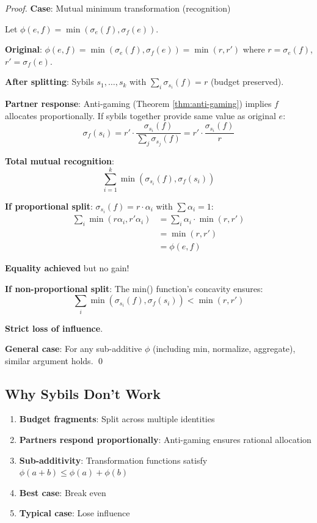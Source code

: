 \documentclass[11pt,a4paper]{article}
\theoremstyle{definition}
\theoremstyle{remark}
\begin{document}
\begin{proof}
\textbf{Case}: Mutual minimum transformation (recognition)

Let $\phi(e,f) = \min(\sigma_e(f), \sigma_f(e))$.

\textbf{Original}: $\phi(e,f) = \min(\sigma_e(f), \sigma_f(e)) = \min(r, r')$ where $r = \sigma_e(f)$, $r' = \sigma_f(e)$.

\textbf{After splitting}: Sybils $s_1, \ldots, s_k$ with $\sum_i \sigma_{s_i}(f) = r$ (budget preserved).

\textbf{Partner response}: Anti-gaming (Theorem \ref{thm:anti-gaming}) implies $f$ allocates proportionally. If sybils together provide same value as original $e$:
\[ \sigma_f(s_i) = r' \cdot \frac{\sigma_{s_i}(f)}{\sum_j \sigma_{s_j}(f)} = r' \cdot \frac{\sigma_{s_i}(f)}{r} \]

\textbf{Total mutual recognition}:
\[ \sum_{i=1}^k \min(\sigma_{s_i}(f), \sigma_f(s_i)) \]

\textbf{If proportional split}: $\sigma_{s_i}(f) = r \cdot \alpha_i$ with $\sum \alpha_i = 1$:
\begin{align*}
\sum_i \min(r\alpha_i, r'\alpha_i) &= \sum_i \alpha_i \cdot \min(r, r') \\
&= \min(r, r') \\
&= \phi(e,f)
\end{align*}

\textbf{Equality achieved} but no gain!

\textbf{If non-proportional split}: The min() function's concavity ensures:
\[ \sum_i \min(\sigma_{s_i}(f), \sigma_f(s_i)) < \min(r, r') \]

\textbf{Strict loss of influence}.

\textbf{General case}: For any sub-additive $\phi$ (including min, normalize, aggregate), similar argument holds. \qed
\end{proof}

\subsection{Why Sybils Don't Work}

\begin{enumerate}
\item \textbf{Budget fragments}: Split across multiple identities
\item \textbf{Partners respond proportionally}: Anti-gaming ensures rational allocation
\item \textbf{Sub-additivity}: Transformation functions satisfy $\phi(a+b) \le \phi(a) + \phi(b)$
\item \textbf{Best case}: Break even
\item \textbf{Typical case}: Lose influence
\end{enumerate}
\end{document}
